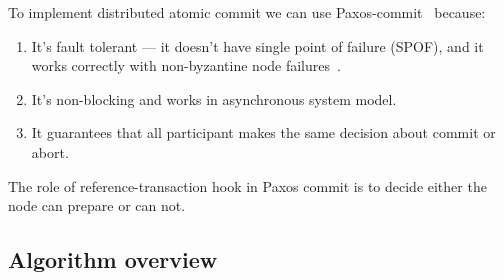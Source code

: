\documentclass[sigplan, screen, nonacm, 11pt]{acmart}
\begin{document}
To implement distributed atomic commit we can use Paxos-commit~\cite{paxos-commit} because:
\begin{enumerate}
  \item It's fault tolerant --- it doesn't have single point of failure (SPOF), and it works correctly with
    non-byzantine node failures~\cite{byzantine-generals}.
  \item It's non-blocking and works in asynchronous system model.
  \item It guarantees that all participant makes the same decision about commit or abort.
\end{enumerate}

The role of reference-transaction hook in Paxos commit is to decide either the node can prepare or can not.

\subsection{Algorithm overview}
\end{document}
